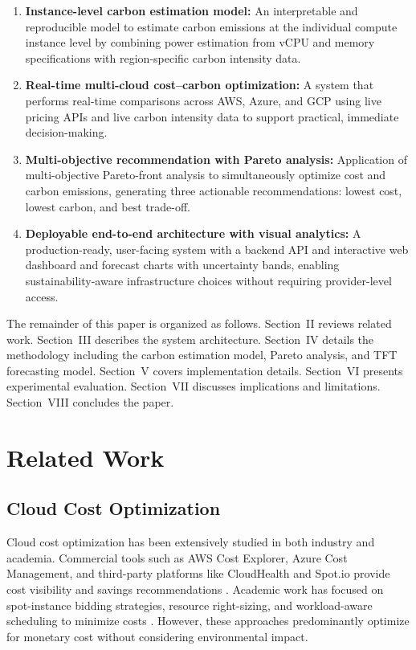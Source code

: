 \documentclass[12pt]{article}
\begin{document}
\begin{enumerate}
    \item \textbf{Instance-level carbon estimation model:} An interpretable and reproducible model to estimate carbon emissions at the individual compute instance level by combining power estimation from vCPU and memory specifications with region-specific carbon intensity data.
    \item \textbf{Real-time multi-cloud cost--carbon optimization:} A system that performs real-time comparisons across AWS, Azure, and GCP using live pricing APIs and live carbon intensity data to support practical, immediate decision-making.
    \item \textbf{Multi-objective recommendation with Pareto analysis:} Application of multi-objective Pareto-front analysis to simultaneously optimize cost and carbon emissions, generating three actionable recommendations: lowest cost, lowest carbon, and best trade-off.
    \item \textbf{Deployable end-to-end architecture with visual analytics:} A production-ready, user-facing system with a backend API and interactive web dashboard and forecast charts with uncertainty bands, enabling sustainability-aware infrastructure choices without requiring provider-level access.
\end{enumerate}

The remainder of this paper is organized as follows. Section~II reviews related work. Section~III describes the system architecture. Section~IV details the methodology including the carbon estimation model, Pareto analysis, and TFT forecasting model. Section~V covers implementation details. Section~VI presents experimental evaluation. Section~VII discusses implications and limitations. Section~VIII concludes the paper.

\section{Related Work}

\subsection{Cloud Cost Optimization}

Cloud cost optimization has been extensively studied in both industry and academia. Commercial tools such as AWS Cost Explorer, Azure Cost Management, and third-party platforms like CloudHealth and Spot.io provide cost visibility and savings recommendations \citep{b5}. Academic work has focused on spot-instance bidding strategies, resource right-sizing, and workload-aware scheduling to minimize costs \citep{b6}. However, these approaches predominantly optimize for monetary cost without considering environmental impact.
\end{document}
